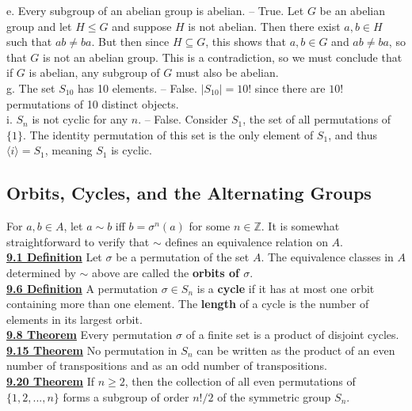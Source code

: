 \documentclass[12pt, letterpaper]{article}
\begin{document}
e. Every subgroup of an abelian group is abelian. -- True. Let $G$ be an abelian group and let $H \leq G$ and suppose $H$ is not abelian. Then there exist $a,b \in H$ such that $ab \neq ba$. But then since $H \subseteq G$, this shows that $a,b \in G$ and $ab \neq ba$, so that $G$ is not an abelian group. This is a contradiction, so we must conclude that if $G$ is abelian, any subgroup of $G$ must also be abelian. \\

g.  The set $S_10$ has 10 elements. -- False. $|S_10| = 10!$ since there are $10!$ permutations of 10 distinct objects.\\

i. $S_n$ is not cyclic for any $n$. -- False. Consider $S_1$, the set of all permutations of $\{1\}$. The identity permutation of this set is the only element of $S_1$, and thus $\langle i \rangle = S_1$, meaning $S_1$ is cyclic. \\

\subsection{Orbits, Cycles, and the Alternating Groups}

For $a,b \in A$, let $a \sim b$ iff $b = \sigma^n(a)$ for some $n \in \mathbb{Z}$. It is somewhat straightforward to verify that $\sim$ defines an equivalence relation on $A$. \\

\noindent \underline{\bf 9.1 Definition} Let $\sigma$ be a permutation of the set $A$. The equivalence classes in $A$ determined by $\sim$ above are called the {\bf orbits of $\sigma$}. \\

\noindent \underline{\bf 9.6 Definition} A permutation $\sigma \in S_n$ is a {\bf cycle} if it has at most one orbit containing more than one element. The {\bf length} of a cycle is the number of elements in its largest orbit. \\

\noindent \underline{\bf 9.8 Theorem} Every permutation $\sigma$ of a finite set is a product of disjoint cycles. \\

\noindent \underline{\bf 9.15 Theorem} No permutation in $S_n$ can be written as the product of an even number of transpositions and as an odd number of transpositions. \\

\noindent \underline{\bf 9.20 Theorem} If $n \geq 2$, then the collection of all even permutations of $\{1,2,...,n\}$ forms a subgroup of order $n!/2$ of the symmetric group $S_n$. \\
\end{document}

